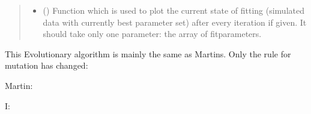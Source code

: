 \documentclass[letterpaper,10pt,english]{sphinxmanual}
\begin{document}
\begin{fulllineitems}
\begin{quote}
\begin{description}
\begin{itemize}
\item {} 
 () \textendash{} Function which is used to plot the current state of fitting (simulated data with currently best parameter set) after every iteration if given. It should take only one parameter: the array of fitparameters.

\end{itemize}

\end{description}\end{quote}

This Evolutionary algorithm is mainly the same as Martins. Only the rule for mutation has changed:

\begin{DUlineblock}{0em}
\item[] Martin: 
\item[] I:      
\end{DUlineblock}

\end{fulllineitems}

\end{document}
